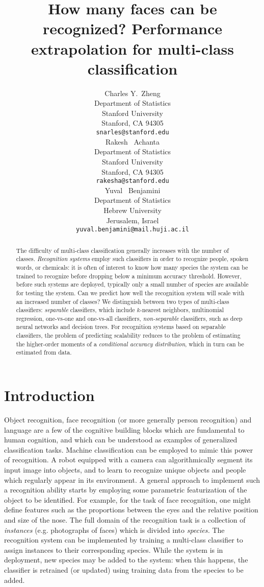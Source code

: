 \documentclass{article}
\title{How many faces can be recognized? Performance extrapolation for
  multi-class classification}
\author{
  Charles Y.~Zheng \\
  Department of Statistics\\
  Stanford University\\
  Stanford, CA 94305 \\
  \texttt{snarles@stanford.edu} \\
  \And
  Rakesh ~Achanta \\
  Department of Statistics\\
  Stanford University\\
  Stanford, CA 94305 \\
  \texttt{rakesha@stanford.edu} \\
  \And
  Yuval ~Benjamini \\
  Department of Statistics \\
  Hebrew University\\
  Jerusalem, Israel\\
  \texttt{yuval.benjamini@mail.huji.ac.il}
}
\begin{document}

\maketitle

\begin{abstract}
The difficulty of multi-class classification generally increases with
the number of classes.  \emph{Recognition systems} employ such classifiers 
in order to recognize people, spoken words, or chemicals:
it is often of interest to know how many species the system can be
trained to recognize before dropping below a minimum accuracy
threshold.  However, before such systems are deployed, typically only
a small number of species are available for testing the system.  Can
we predict how well the recognition system will scale with an
increased number of classes?  We distinguish between two types of
multi-class classifiers: \emph{separable} classifiers, which include $k$-nearest neighbors, multinomial regression,
one-vs-one and one-vs-all classifiers, 
\emph{non-separable} classifiers, such as deep neural networks and decision trees.  For recognition systems based on separable classifiers, the problem of predicting
scalability reduces to the problem of estimating the higher-order
moments of a \emph{conditional accuracy distribution}, which in turn can
be estimated from data.
\end{abstract}

\section{Introduction}

Object recognition, face recognition (or more generally person
recognition) and language are a few of the cognitive building blocks
which are fundamental to human cognition, and which can be understood
as examples of generalized classification tasks. Machine
classification can be employed to mimic this power of recognition.  A
robot equipped with a camera can algorithmically segment its input
image into objects, and to learn to recognize unique objects and
people which regularly appear in its environment.  A general approach
to implement such a recognition ability starts by employing some
parametric featurization of the object to be identified.  For example,
for the task of face recognition, one might define features such as
the proportions between the eyes and the relative position and size of
the nose.  The full domain of the recognition task is a collection of
\emph{instances} (e.g. photographs of faces) which is divided into
\emph{species.}  The recognition system can be implemented by training
a multi-class classifier to assign instances to their corresponding
species.  While the system is in deployment, new species may be added
to the system: when this happens, the classifier is retrained (or
updated) using training data from the species to be added.
\end{document}
